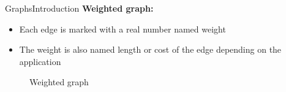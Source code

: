 
\begin{frame}{Graphs}{Introduction}
  \textbf{Weighted graph:}
  \begin{itemize}
    \item
      Each edge is marked with a real number named {\color{Mittel-Blau}weight}
    \item
      The {\color{Mittel-Blau}weight} is also named {\color{Mittel-Blau}length}
      or {\color{Mittel-Blau}cost} of the edge depending on the application
  \end{itemize}
  \begin{figure}
    \begin{adjustbox}{width=0.75\linewidth}
      
    \end{adjustbox}
    \caption{Weighted graph}
    \label{fig:graphs:introduction_weighted}
  \end{figure}
\end{frame}


